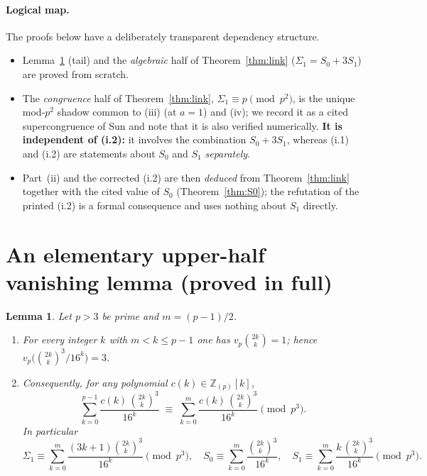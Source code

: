 \documentclass[12pt]{article}
\newtheorem{lemma}{Lemma}
\theoremstyle{remark}
\newcommand{\bin}[2]{\binom{#1}{#2}}
\newcommand{\Zp}{\mathbb{Z}_{(p)}}
\begin{document}
\paragraph{Logical map.}  The proofs below have a deliberately transparent
dependency structure.
\begin{itemize}
\item Lemma~\ref{lem:upperhalf} (tail) and the \emph{algebraic} half of
Theorem~\ref{thm:link} ($\Sigma_1=S_0+3S_1$) are proved from scratch.
\item The \emph{congruence} half of Theorem~\ref{thm:link},
$\Sigma_1\equiv p\pmod{p^2}$, is the unique mod-$p^2$ shadow common to (iii)
(at $a=1$) and (iv); we record it as a cited supercongruence of Sun and note
that it is also verified numerically.  \textbf{It is independent of (i.2):} it
involves the combination $S_0+3S_1$, whereas (i.1) and (i.2) are statements
about $S_0$ and $S_1$ \emph{separately}.
\item Part~(ii) and the corrected (i.2) are then \emph{deduced} from
Theorem~\ref{thm:link} together with the cited value of $S_0$
(Theorem~\ref{thm:S0}); the refutation of the printed (i.2) is a formal
consequence and uses nothing about $S_1$ directly.
\end{itemize}

\section{An elementary upper-half vanishing lemma (proved in full)}

\begin{lemma}\label{lem:upperhalf}
Let $p>3$ be prime and $m=(p-1)/2$.
\begin{enumerate}
\item For every integer $k$ with $m<k\le p-1$ one has $v_p\!\bin{2k}{k}=1$;
hence $v_p\!\bigl(\bin{2k}{k}^3/16^k\bigr)=3$.
\item Consequently, for any polynomial $c(k)\in\Zp[k]$,
\[
\sum_{k=0}^{p-1}\frac{c(k)\,\bin{2k}{k}^3}{16^k}
\;\equiv\;\sum_{k=0}^{m}\frac{c(k)\,\bin{2k}{k}^3}{16^k}\pmod{p^3}.
\]
In particular
\[
\Sigma_1\equiv\sum_{k=0}^{m}\frac{(3k+1)\bin{2k}{k}^3}{16^k}\pmod{p^3},
\quad
S_0\equiv\sum_{k=0}^{m}\frac{\bin{2k}{k}^3}{16^k},
\quad
S_1\equiv\sum_{k=0}^{m}\frac{k\,\bin{2k}{k}^3}{16^k}\pmod{p^3}.
\]
\end{enumerate}
\end{lemma}
\end{document}
